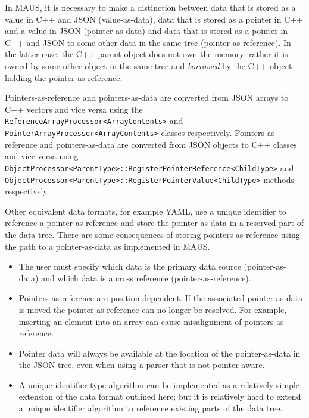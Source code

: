 In MAUS, it is necessary to make a distinction between data that is stored as a value in C++ and JSON (value-as-data), data that is stored as a pointer in C++ and a value in JSON (pointer-as-data) and data that is stored as a pointer in C++ and JSON to some other data in the same tree (pointer-as-reference). In the latter case, the C++ parent object does not own the memory; rather it is owned by some other object in the same tree and \emph{borrowed} by the C++ object holding the pointer-as-reference.

Pointers-as-reference and pointers-as-data are converted from JSON arrays to C++ vectors and vice versa using the \verb|ReferenceArrayProcessor<ArrayContents>| and \verb|PointerArrayProcessor<ArrayContents>| classes respectively. Pointers-as-reference and pointers-as-data are converted from JSON objects to C++ classes and vice versa using \verb|ObjectProcessor<ParentType>::RegisterPointerReference<ChildType>| and \verb|ObjectProcessor<ParentType>::RegisterPointerValue<ChildType>| methods respectively.

Other equivalent data formats, for example YAML, use a unique identifier to reference a pointer-as-reference and store the pointer-as-data in a reserved part of the data tree. There are some consequences of storing pointers-as-reference using the path to a pointer-as-data as implemented in MAUS.
\begin{itemize}
\item The user must specify which data is the primary data source (pointer-as-data) and which data is a cross reference (pointer-as-reference).
\item Pointers-as-reference are position dependent. If the associated pointer-as-data is moved the pointer-as-reference can no longer be resolved. For example, inserting an element into an array can cause misalignment of pointers-as-reference.
\item Pointer data will always be available at the location of the pointer-as-data in the JSON tree, even when using a parser that is not pointer aware.
\item A unique identifier type algorithm can be implemented as a relatively simple extension of the data format outlined here; but it is relatively hard to extend a unique identifier algorithm to reference existing parts of the data tree.
\end{itemize}

